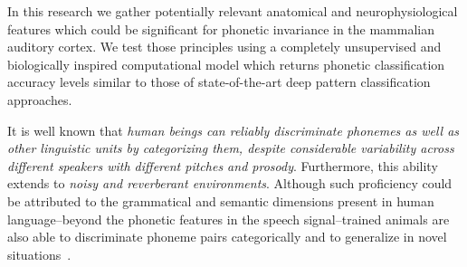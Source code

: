 \documentclass[10pt,letterpaper]{article}
\begin{document}
\nolinenumbers




































































\iffalse
In this research we gather potentially relevant anatomical and neurophysiological features which could be significant for phonetic invariance in the mammalian auditory cortex. We test those principles using a completely unsupervised and biologically inspired computational model which returns phonetic classification accuracy levels similar to those of state-of-the-art deep pattern classification approaches.

It is well known that \emph{human beings can reliably discriminate phonemes as well as other linguistic units by categorizing them, despite considerable variability across different speakers with different pitches and prosody}. Furthermore, this ability extends to \emph{noisy and reverberant environments}.
Although such proficiency could be attributed to the grammatical and semantic dimensions present in human language--beyond the phonetic features in the speech signal--trained animals are also able to discriminate phoneme pairs categorically and to generalize in novel situations~\cite{kuhl_1975, kuhl_1983, kluender_1998, pons_2006, hienz_1996, dent_1997, lotto_1997}.
\end{document}
